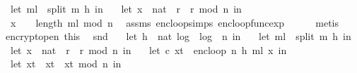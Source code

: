 \begin{isabellebody}
\ \ let\ m{\isacharunderscore}{\kern0pt}l\ {\isacharequal}{\kern0pt}\ split\ m\ h\ in\ \isanewline
\ \ let\ {\isacharparenleft}{\kern0pt}x{\isacharunderscore}{\kern0pt}{}\ {\isacharcolon}{\kern0pt}{\isacharcolon}{\kern0pt}\ nat{\isacharparenright}{\kern0pt}\ {\isacharequal}{\kern0pt}\ {\isacharparenleft}{\kern0pt}r\ {\isacharasterisk}{\kern0pt}\ r{\isacharparenright}{\kern0pt}\ mod\ n\ in\ \isanewline
\ \ {\isacharparenleft}{\kern0pt}x{\isacharunderscore}{\kern0pt}{}\ {\isacharcircum}{\kern0pt}\ {\isacharparenleft}{\kern0pt}{}\ {\isacharcircum}{\kern0pt}\ {\isacharparenleft}{\kern0pt}length\ m{\isacharunderscore}{\kern0pt}l{\isacharparenright}{\kern0pt}{\isacharparenright}{\kern0pt}\ mod\ n{\isacharparenright}{\kern0pt}{\isacharparenright}{\kern0pt}{\isachardoublequoteclose}\ \isamarkupfalse%
\ assms{\isacharparenleft}{\kern0pt}{}{\isacharparenright}{\kern0pt}\ enc{\isacharunderscore}{\kern0pt}loop{\isachardot}{\kern0pt}simps\ enc{\isacharunderscore}{\kern0pt}loop{\isacharunderscore}{\kern0pt}func{\isacharunderscore}{\kern0pt}exp\isanewline
\ \ \ \ \isamarkupfalse%
\ {\isacharparenleft}{\kern0pt}metis{\isacharparenright}{\kern0pt}\isanewline
\ \ \isamarkupfalse%
\ encrypt{\isacharunderscore}{\kern0pt}open\ this\ \isamarkupfalse%
\ {\isachardoublequoteopen}snd\ {\isacharparenleft}{\kern0pt}\isanewline
\ \ let\ h\ {\isacharequal}{\kern0pt}\ nat\ {\isasymlfloor}log\ {}\ {\isacharparenleft}{\kern0pt}log\ {}\ n{\isacharparenright}{\kern0pt}{\isasymrfloor}\ in\ \isanewline
\ \ let\ m{\isacharunderscore}{\kern0pt}l\ {\isacharequal}{\kern0pt}\ split\ m\ h\ in\ \isanewline
\ \ let\ {\isacharparenleft}{\kern0pt}x{\isacharunderscore}{\kern0pt}{}\ {\isacharcolon}{\kern0pt}{\isacharcolon}{\kern0pt}\ nat{\isacharparenright}{\kern0pt}\ {\isacharequal}{\kern0pt}\ {\isacharparenleft}{\kern0pt}r\ {\isacharasterisk}{\kern0pt}\ r{\isacharparenright}{\kern0pt}\ mod\ n\ in\ \isanewline
\ \ let\ {\isacharparenleft}{\kern0pt}c{\isacharcomma}{\kern0pt}\ x{\isacharunderscore}{\kern0pt}t{\isacharparenright}{\kern0pt}\ {\isacharequal}{\kern0pt}\ enc{\isacharunderscore}{\kern0pt}loop\ {\isacharparenleft}{\kern0pt}n{\isacharcomma}{\kern0pt}\ h{\isacharcomma}{\kern0pt}\ m{\isacharunderscore}{\kern0pt}l{\isacharparenright}{\kern0pt}\ x{\isacharunderscore}{\kern0pt}{}\ in\ \isanewline
\ \ let\ x{\isacharunderscore}{\kern0pt}t{\isacharprime}{\kern0pt}\ {\isacharequal}{\kern0pt}\ x{\isacharunderscore}{\kern0pt}t\ {\isacharasterisk}{\kern0pt}\ x{\isacharunderscore}{\kern0pt}t\ mod\ n\ in\ \isanewline

\end{isabellebody}
